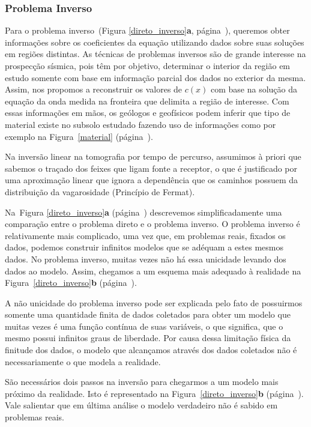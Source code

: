 \documentclass[a4paper, 12 pt]{article} %
\begin{document}

\subsubsection{Problema Inverso}

Para o problema inverso~(Figura \ref{direto_inverso}\textbf{a}, página~\pageref{direto_inverso}), queremos obter informações sobre os coeficientes da equação utilizando dados sobre suas soluções em regiões distintas. As técnicas de problemas inversos são de grande interesse na prospecção sísmica, pois têm por objetivo, determinar o interior da região em estudo somente com base em informação parcial dos dados no exterior da mesma. Assim, nos propomos a reconstruir os valores de $c(x)$ com base na solução da
equação da onda medida na fronteira que delimita a região de interesse. Com essas informações em mãos, os geólogos e geofísicos podem inferir que tipo de material existe no subsolo estudado fazendo uso de informações como por
exemplo na Figura~\ref{material} (página~\pageref{material}).

Na inversão linear na tomografia por tempo de percurso, assumimos à priori que sabemos o traçado dos feixes que ligam fonte a receptor, o que é justificado por uma aproximação linear que ignora a dependência que os caminhos possuem da distribuição da vagarosidade (Princípio de Fermat).

Na~Figura \ref{direto_inverso}\textbf{a} (página~\pageref{direto_inverso}) descrevemos simplificadamente uma comparação entre o problema direto e o problema inverso. O problema inverso é relativamente mais complicado, uma vez que, em problemas reais, fixados os dados, podemos construir infinitos modelos que se adéquam a estes mesmos dados. No problema inverso, muitas vezes não há essa unicidade levando dos dados ao modelo. Assim, chegamos a um esquema mais adequado à realidade na Figura~\ref{direto_inverso}\textbf{b} (página~\pageref{direto_inverso}).

A não unicidade do problema inverso pode ser explicada pelo fato de possuirmos somente uma quantidade finita de dados coletados para obter um modelo que muitas vezes é uma função contínua de suas variáveis, o que significa, que o mesmo possui infinitos graus de liberdade. Por causa dessa limitação física da finitude dos dados, o modelo que alcançamos através dos dados coletados não é necessariamente o que modela a realidade.

São necessários dois passos na inversão para chegarmos a um modelo mais próximo da realidade. Isto é representado na Figura~\ref{direto_inverso}\textbf{b} (página~\pageref{direto_inverso}). Vale salientar que em última análise o modelo verdadeiro não é sabido em problemas reais.
\end{document}
